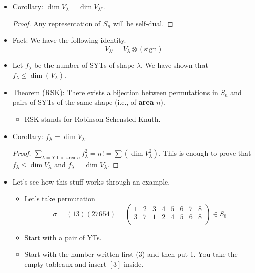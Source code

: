 \documentclass[../notes.tex]{subfiles}
\begin{document}
\begin{itemize}
\begin{proof}
\begin{proof}
            We will not give a rigorous proof here; the above example is illustrative.
        \end{proof}
        Rudenko will not finish this one.
    \end{proof}
    \item Corollary: $\dim V_\lambda=\dim V_{\lambda'}$.
    \begin{proof}
        Any representation of $S_n$ will be self-dual.
    \end{proof}
    \item Fact: We have the following identity.
    \begin{equation*}
        V_{\lambda'} = V_\lambda\otimes(\text{sign})
    \end{equation*}
    \item Let $f_\lambda$ be the number of SYTs of shape $\lambda$. We have shown that $f_\lambda\leq\dim(V_\lambda)$.
    \item Theorem (RSK): There exists a bijection between permutations in $S_n$ and pairs of SYTs of the same shape (i.e., of \textbf{area} $n$).
    \begin{itemize}
        \item RSK stands for Robinson-Schensted-Knuth.
    \end{itemize}
    \item Corollary: $f_\lambda=\dim V_\lambda$.
    \begin{proof}
        $\sum_{\lambda=\text{YT of area }n}f_\lambda^2
        = n!
        = \sum(\dim V_\lambda^2)$.
        This is enough to prove that $f_\lambda\leq\dim V_\lambda$ and $f_\lambda=\dim V_\lambda$.
    \end{proof}
    \item Let's see how this stuff works through an example.
    \begin{itemize}
        \item Let's take permutation
        \begin{equation*}
            \sigma = (13)(27654) =
            \begin{pmatrix}
                1 & 2 & 3 & 4 & 5 & 6 & 7 & 8\\
                3 & 7 & 1 & 2 & 4 & 5 & 6 & 8\\
            \end{pmatrix}
            \in S_8
        \end{equation*}
        \item Start with a pair of YTs.
        \item Start with the number written first (3) and then put 1. You take the empty tableaux and insert $[3]$ inside.

\end{itemize}
\end{itemize}
\end{document}
